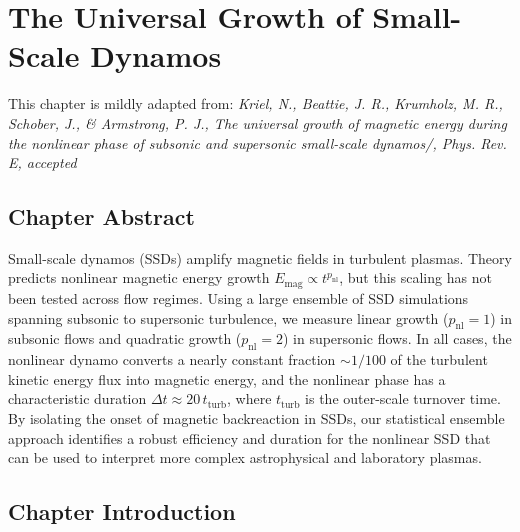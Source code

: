 \chapter{The Universal Growth of Small-Scale Dynamos}
\label{chapter:ssd-nl}

\noindent\hfill\parbox{0.815\textwidth}{\raggedleft
This chapter is mildly adapted from:
\textit{Kriel, N., Beattie, J. R., Krumholz, M. R., Schober, J., \& Armstrong, P. J., The universal growth of magnetic energy during the nonlinear phase of subsonic and supersonic small-scale dynamos/, Phys. Rev. E, accepted}
}\par

\section{Chapter Abstract}

    Small-scale dynamos (SSDs) amplify magnetic fields in turbulent plasmas. Theory predicts nonlinear magnetic energy growth $E_\mathrm{mag} \propto t^{p_\mathrm{nl}}$, but this scaling has not been tested across flow regimes. Using a large ensemble of SSD simulations spanning subsonic to supersonic turbulence, we measure linear growth ($p_\mathrm{nl} = 1$) in subsonic flows and quadratic growth ($p_\mathrm{nl} = 2$) in supersonic flows. In all cases, the nonlinear dynamo converts a nearly constant fraction $\sim 1/100$ of the turbulent kinetic energy flux into magnetic energy, and the nonlinear phase has a characteristic duration $\Delta t \approx 20\,t_\mathrm{turb}$, where $t_\mathrm{turb}$ is the outer-scale turnover time. By isolating the onset of magnetic backreaction in SSDs, our statistical ensemble approach identifies a robust efficiency and duration for the nonlinear SSD that can be used to interpret more complex astrophysical and laboratory plasmas.

\section{Chapter Introduction}

